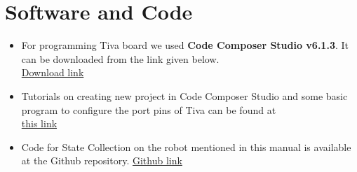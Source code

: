 \documentclass[a4paper,12pt,oneside]{book}
\begin{document}
\section{Software and Code}
\begin{itemize}
	\item For programming Tiva board we used \textbf{Code Composer Studio v6.1.3}. It can be downloaded from the link given below.\\
	\href{http://www.ti.com/tool/ccstudio}{Download link}
	\item Tutorials on creating new project in Code Composer Studio and some basic program to configure the port pins of Tiva can be found at \\
	\href{https://www.cse.iitb.ac.in/~erts/html_pages/Resources/Tiva/TM4C123G_LaunchPad_Workshop_Workbook.pdf}{this link}
	\item Code for State Collection on the robot mentioned in this manual is available at the Github repository.
	\href{https://github.com/eYSIP-2016/Robot_State_Collector/tree/master/code/Tiva}{Github link}
\end{itemize}
\end{document}
